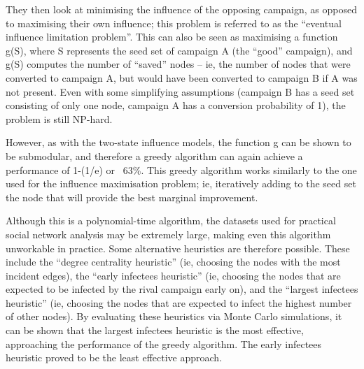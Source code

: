 They then look at minimising the influence of the opposing campaign, as opposed to maximising their own influence; this problem is referred to as the ``eventual influence limitation problem''. This can also be seen as maximising a function g(S), where S represents the seed set of campaign A (the ``good'' campaign), and g(S) computes the number of ``saved'' nodes -- ie, the number of nodes that were converted to campaign A, but would have been converted to campaign B if A was not present. Even with some simplifying assumptions (campaign B has a seed set consisting of only one node, campaign A has a conversion probability of 1), the problem is still NP-hard.

However, as with the two-state influence models, the function g can be shown to be submodular, and therefore a greedy algorithm can again achieve a performance of 1-(1/e) or ~63\%. This greedy algorithm works similarly to the one used for the influence maximisation problem; ie, iteratively adding to the seed set the node that will provide the best marginal improvement.

Although this is a polynomial-time algorithm, the datasets used for practical social network analysis may be extremely large, making even this algorithm unworkable in practice. Some alternative heuristics are therefore possible. These include the ``degree centrality heuristic'' (ie, choosing the nodes with the most incident edges), the ``early infectees heuristic'' (ie, choosing the nodes that are expected to be infected by the rival campaign early on), and the ``largest infectees heuristic'' (ie, choosing the nodes that are expected to infect the highest number of other nodes). By evaluating these heuristics via Monte Carlo simulations, it can be shown that the largest infectees heuristic is the most effective, approaching the performance of the greedy algorithm. The early infectees heuristic proved to be the least effective approach.

